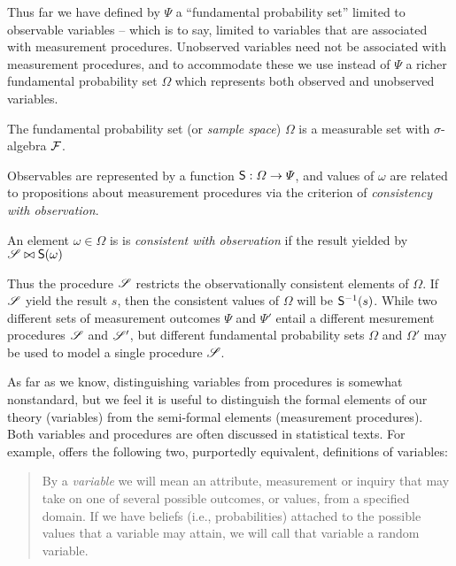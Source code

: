 Thus far we have defined by $\Psi$ a ``fundamental probability set'' limited to observable variables -- which is to say, limited to variables that are associated with measurement procedures. Unobserved variables need not be associated with measurement procedures, and to accommodate these we use instead of $\Psi$ a richer fundamental probability set $\Omega$ which represents both observed and unobserved variables.

\begin{definition}
The fundamental probability set (or \emph{sample space}) $\Omega$ is a measurable set with $\sigma$-algebra $\mathcal{F}$.
\end{definition}

Observables are represented by a function $\mathsf{S}:\Omega\to \Psi$, and values of $\omega$ are related to propositions about measurement procedures via the criterion of \emph{consistency with observation}.

\begin{definition}
An element $\omega\in \Omega$ is is \emph{consistent with observation} if the result yielded by $\mathscr{S}\bowtie \mathsf{S}(\omega)$
\end{definition}

Thus the procedure $\mathscr{S}$ restricts the observationally consistent elements of $\Omega$. If $\mathscr{S}$ yield the result $s$, then the consistent values of $\Omega$ will be $\mathsf{S}^{-1}(s)$. While two different sets of measurement outcomes $\Psi$ and $\Psi'$ entail a different mesurement procedures $\mathscr{S}$ and $\mathscr{S}'$, but different fundamental probability sets $\Omega$ and $\Omega'$ may be used to model a single procedure $\mathscr{S}$.

As far as we know, distinguishing variables from procedures is somewhat nonstandard, but we feel it is useful to distinguish the formal elements of our theory (variables) from the semi-formal elements (measurement procedures). Both variables and procedures are often discussed in statistical texts. For example, \citet{pearl_causality:_2009} offers the following two, purportedly equivalent, definitions of variables:
\begin{quote}
By a \emph{variable} we will mean an attribute, measurement or inquiry that may take on one of several possible outcomes, or values, from a specified domain. If we have beliefs (i.e., probabilities) attached to the possible values that a variable may attain, we will call that variable a random variable.
\end{quote}

